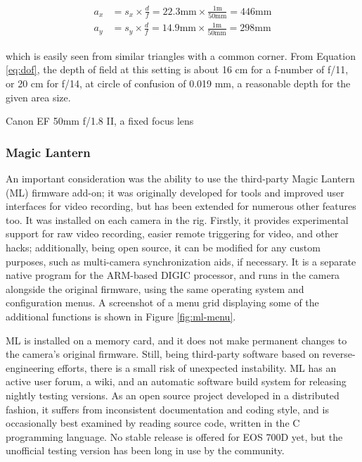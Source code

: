 \begin{align} \label{equ:areasize} \begin{split}
	a_x &= s_x \times \frac{d}{f} = 22.3 \text{mm} \times \frac{1 \text{m}}{50 \text{mm}} = 446 \text{mm}\\
	a_y &= s_y \times \frac{d}{f} = 14.9 \text{mm} \times \frac{1 \text{m}}{50 \text{mm}} = 298 \text{mm}
\end{split} \end{align}

which is easily seen from similar triangles with a common corner.
From Equation \ref{eq:dof}, the depth of field at this setting is about 16 cm for a f-number of f/11, or 20 cm for f/14, at circle of confusion of 0.019 mm, a reasonable depth for the given area size.

{Canon EF 50mm f/1.8 II, a fixed focus lens}

\subsubsection{Magic Lantern}

An important consideration was the ability to use the third-party Magic Lantern (ML) firmware add-on;
it was originally developed for tools and improved user interfaces for video recording, but has been extended for numerous other features too.
It was installed on each camera in the rig.
Firstly, it provides experimental support for raw video recording, easier remote triggering for video, and other hacks;
additionally, being open source, it can be modified for any custom purposes, such as multi-camera synchronization aids, if necessary.
It is a separate native program for the ARM-based DIGIC processor, and runs in the camera alongside the original firmware, using the same operating system and configuration menus. \cite{magiclantern}
A screenshot of a menu grid displaying some of the additional functions is shown in Figure \ref{fig:ml-menu}.

ML is installed on a memory card, and it does not make permanent changes to the camera's original firmware.
Still, being third-party software based on reverse-engineering efforts, there is a small risk of unexpected instability.
ML has an active user forum, a wiki, and an automatic software build system for releasing nightly testing versions.
As an open source project developed in a distributed fashion, it suffers from inconsistent documentation and coding style, and is occasionally best examined by reading source code, written in the C programming language.
No stable release is offered for EOS 700D yet, but the unofficial testing version has been long in use by the community. \cite{magiclantern}

